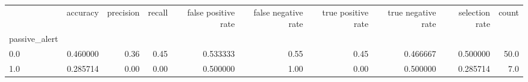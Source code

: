 \begin{tabular}{lrrrrrrrrr}
\toprule
{} &  accuracy &  precision &  recall &  false positive rate &  false negative rate &  true positive rate &  true negative rate &  selection rate &  count \\
passive\_alert &           &            &         &                      &                      &                     &                     &                 &        \\
\midrule
0.0           &  0.460000 &       0.36 &    0.45 &             0.533333 &                 0.55 &                0.45 &            0.466667 &        0.500000 &   50.0 \\
1.0           &  0.285714 &       0.00 &    0.00 &             0.500000 &                 1.00 &                0.00 &            0.500000 &        0.285714 &    7.0 \\
\bottomrule
\end{tabular}
